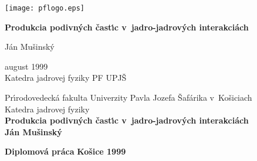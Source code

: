 \begin{titlepage}
\begin{center}
\texttt{[image: pflogo.eps]}
\end{center}
\vspace*{2.5cm}
\begin{center}
{\Large{\bf Produkcia podivn\'ych \v cast\'\i c v~jadro-jadrov\'ych
interakci\'ach}} 
\end{center}
\vspace*{2cm}
\begin{center}
{\Large J\'an Mu\v{s}insk\'y}
\end{center}
\vspace*{5cm}
\begin{center}
  august 1999 \\
 Katedra jadrovej fyziky PF UPJ\v{S}
\end{center}

\end{titlepage}
\begin{titlepage}
\vspace*{2cm} \begin{center}
{\LARGE Pr\'\i rodovedeck\'a fakulta Univerzity Pavla
Jozefa \v Saf\'arika v~Ko\v siciach \\ \vspace{3ex} Katedra jadrovej fyziky}
\\ \vspace{3cm} {\Huge{\bf Produkcia podivn\'ych \v cast\'\i c
v~jadro-jadrov\'ych interakci\'ach}} \\ \vspace{1cm}
{\large{\bf J\'an Mu\v sinsk\'y}} \end{center}
\vspace{6cm} {\bf Diplomov\'a pr\'aca} \hfill {\bf Ko\v sice 1999}
\end{titlepage}
